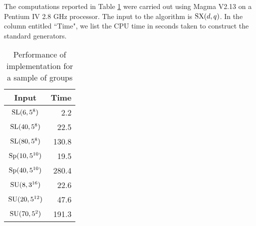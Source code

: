 \documentclass[12pt]{article}
\def\SL{{\rm SL}}
\def\Sp{{\rm Sp}}
\def\SU{{\rm SU}}
\def\SX{{\rm SX}}
\begin{document}
The computations reported in Table \ref{table1} were carried out
using {\sc Magma} V2.13 on a Pentium IV 2.8 GHz processor.
The input to the algorithm is $\SX (d, q)$.
In the column entitled ``Time", we list the CPU time in seconds
taken to construct the standard generators.

\begin{table}[h]
\caption{Performance of implementation for a sample of groups}
\label{table1}
\begin{center}
\begin{tabular}
{|c|r|} \hline
Input  &   Time  \rule{0cm}{2.5ex}\\
\hline
$\SL(6, 5^8)$  & 2.2 \rule{0cm}{2.5ex}\\ \hline
$\SL(40, 5^8)$  & 22.5 \rule{0cm}{2.5ex}\\ \hline
$\SL(80, 5^8)$  & 130.8 \rule{0cm}{2.5ex}\\ \hline
$\Sp(10,5^{10})$ & 19.5 \rule{0cm}{2.5ex}\\ \hline
$\Sp(40,5^{10})$ & 280.4 \rule{0cm}{2.5ex}\\ \hline
$\SU(8,3^{16})$ & 22.6 \rule{0cm}{2.5ex}\\ \hline
$\SU(20, 5^{12})$ & 47.6 \rule{0cm}{2.5ex}\\ \hline
$\SU(70, 5^2)$ & 191.3 \rule{0cm}{2.5ex}\\ \hline
\end{tabular}
\end{center}
\end{table}
\end{document}
